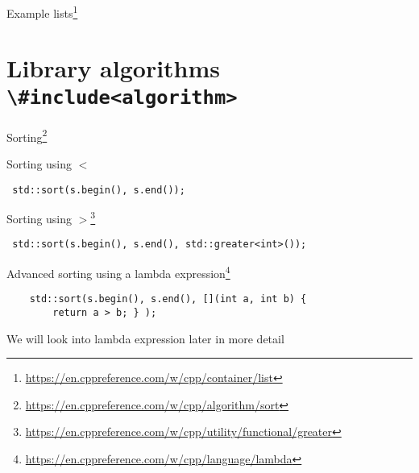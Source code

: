 \documentclass[\classoption]{beamer}
\begin{document}
\begin{frame}{Example lists\footnote{\tiny\url{https://en.cppreference.com/w/cpp/container/list}}}



\end{frame}

\section{Library algorithms \lstinline|\#include<algorithm>|}


\begin{frame}[fragile]{Sorting\footnote{\tiny\url{https://en.cppreference.com/w/cpp/algorithm/sort}}}

\begin{block}{Sorting using $<$}
\vspace{-0.25cm}
\begin{lstlisting}
 std::sort(s.begin(), s.end());
\end{lstlisting}
\end{block}

\begin{block}{Sorting using $>$\footnote{\tiny\url{https://en.cppreference.com/w/cpp/utility/functional/greater}}}
\vspace{-0.25cm}
\begin{lstlisting}
 std::sort(s.begin(), s.end(), std::greater<int>());
\end{lstlisting}
\end{block}
\vspace{-0.25cm}
\begin{block}{Advanced sorting using a lambda expression\footnote{\tiny\url{https://en.cppreference.com/w/cpp/language/lambda}} }
\vspace{-0.25cm}
\begin{lstlisting}
    std::sort(s.begin(), s.end(), [](int a, int b) {
        return a > b; } );
\end{lstlisting}
\end{block}
We will look into lambda expression later in more detail
\end{frame}
\end{document}
